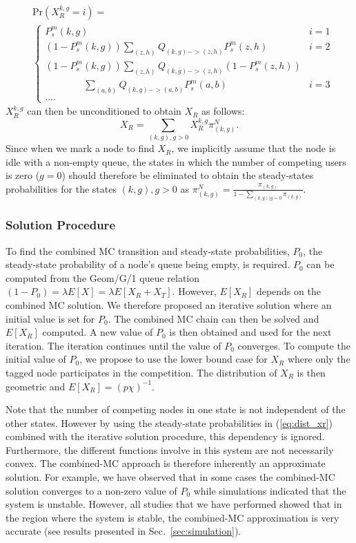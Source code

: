 \documentclass[12pt,journal,oneside,onecolumn]{IEEEtran}
\begin{document}
\small
\begin{align}
&\text{Pr} (X_R^{k,g}=i)=  \nonumber \\
&\begin{cases}
P^{m}_s(k,g) & i=1 \\
(1-P^{m}_s(k,g))\sum_{(z,h)}{Q_{(k,g)->(z,h)}P^{m}_s(z,h)} & i=2\\
(1-P^{m}_s(k,g))\sum_{(z,h)}{Q_{(k,g)->(z,h)} (1-P^{m}_s(z,h))} & \\
\qquad \qquad \sum_{(a,b)}{Q_{(k,g)->(a,b)}P^{m}_s(a,b)} & i=3\\
....
\end{cases}
\label{eq:XRk,g}
\end{align}
\normalsize
$X_R^{k,g}$ can then be unconditioned to obtain $X_R$ as follows:
\begin{equation}
X_R=\sum_{(k,g),g>0}{X_R^{k,g} \pi^{N}_{(k,g)}}.
\label{eq:dist_xr}
\end{equation}
Since when we mark a node to find $X_R$, 
we implicitly assume that the node is idle with a non-empty queue,
the states in which the number of competing users is zero ($g=0$) 
should therefore be eliminated to obtain the steady-states probabilities for the states $(k,g), g>0$ as $\pi^{N}_{(k,g)}= 
\frac{\pi_{(k,g)}}{1-\sum_{(k,g)|g=0}{\pi_{(k,g)}}}$.


\subsubsection{Solution Procedure}
\label{sec:sol_proc}

To find the combined MC transition and steady-state probabilities, $P_0$, the steady-state probability of 
a node's queue being empty, is required. $P_0$ can be computed from the Geom/G/1 queue
relation $(1-P_0)=\lambda E[X]=\lambda E[X_R+X_T]$. However, $E[X_R]$ depends on the combined MC solution.  
We therefore proposed an iterative solution where an initial value is set for $P_0$. 
The combined MC chain can then be solved and $E[X_R]$ computed. A new value of $P_0$ is then obtained and
used for the next iteration.
The iteration continues until the value of $P_0$ converges. 
To compute the initial value of $P_0$, we propose to use the lower bound case for $X_R$  
where only the tagged node participates in the competition. The distribution of $X_R$ is then geometric and $E[X_{R}] = (p \chi)^{-1}$.

Note that the number of competing nodes in one state is not independent of the other states. 
However by using the steady-state probabilities in (\ref{eq:dist_xr}) combined with the iterative solution procedure, this dependency is ignored. 
Furthermore, the different functions involve in this system are not necessarily convex. 
The combined-MC approach is therefore inherently an approximate solution.
For example, we have observed that in some cases the combined-MC solution converges to a non-zero value of $P_0$ while
simulations indicated that the system is unstable. However, all studies that we have performed showed that in the region where
the system is stable, the combined-MC approximation is very accurate (see results presented in Sec.~\ref{sec:simulation}).
\end{document}
